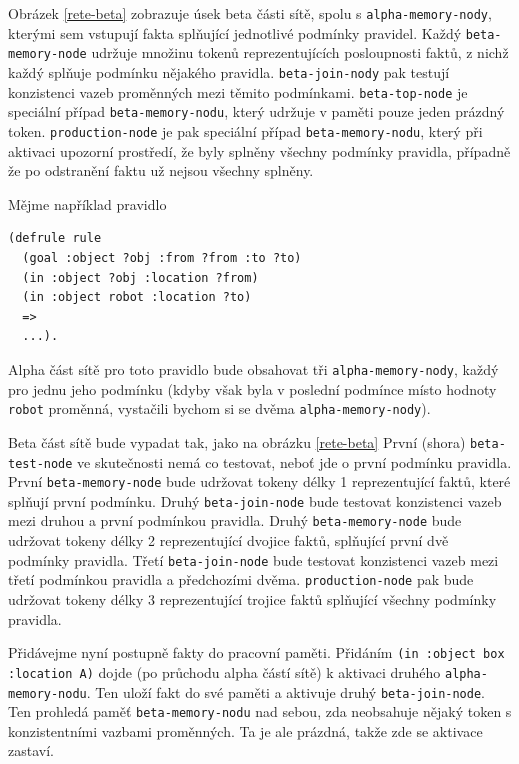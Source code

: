 Obrázek \ref{rete-beta} zobrazuje úsek beta části sítě, spolu s
\verb|alpha-memory-nody|, kterými sem vstupují fakta splňující jednotlivé
podmínky pravidel. Každý \verb|beta-memory-node| udržuje množinu tokenů
reprezentujících posloupnosti faktů, z nichž každý splňuje podmínku nějakého
pravidla. \verb|beta-join-nody| pak testují konzistenci vazeb proměnných mezi
těmito podmínkami. \verb|beta-top-node| je speciální případ
\verb|beta-memory-nodu|, který udržuje v paměti pouze jeden prázdný token.
\verb|production-node| je pak speciální případ \verb|beta-memory-nodu|, který
při aktivaci upozorní prostředí, že byly splněny všechny podmínky pravidla,
případně že po odstranění faktu už nejsou všechny splněny.

Mějme například pravidlo
\begin{verbatim}
(defrule rule
  (goal :object ?obj :from ?from :to ?to)
  (in :object ?obj :location ?from)
  (in :object robot :location ?to)
  =>
  ...).
\end{verbatim}
Alpha část sítě pro toto pravidlo bude obsahovat tři \verb|alpha-memory-nody|,
každý pro jednu jeho podmínku (kdyby však byla v poslední podmínce místo hodnoty
\verb|robot| proměnná, vystačili bychom si se dvěma \verb|alpha-memory-nody|).

Beta část sítě bude vypadat tak, jako na obrázku \ref{rete-beta}
První (shora) \verb|beta-test-node| ve skutečnosti nemá co testovat, neboť jde o
první podmínku pravidla. První \verb|beta-memory-node| bude udržovat tokeny
délky 1 reprezentující  faktů, které splňují první podmínku.
Druhý \verb|beta-join-node| bude testovat konzistenci vazeb mezi druhou
a první podmínkou pravidla. Druhý \verb|beta-memory-node| bude udržovat tokeny
délky 2 reprezentující dvojice faktů, splňující první dvě podmínky pravidla.
Třetí \verb|beta-join-node| bude testovat konzistenci vazeb mezi třetí podmínkou
pravidla a předchozími dvěma. \verb|production-node| pak bude udržovat tokeny
délky 3 reprezentující trojice faktů splňující všechny podmínky pravidla.


Přidávejme nyní postupně fakty do pracovní paměti. Přidáním
\verb|(in :object box :location A)| dojde (po průchodu alpha částí sítě) k
aktivaci druhého \verb|alpha-memory-nodu|. Ten uloží fakt do své paměti
a aktivuje  druhý \verb|beta-join-node|. Ten prohledá paměť
\verb|beta-memory-nodu| nad sebou, zda neobsahuje nějaký token s
konzistentními vazbami proměnných. Ta je ale prázdná, takže zde se aktivace
zastaví.

